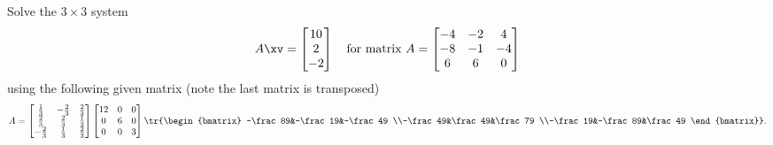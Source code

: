 \begin{example} \label{eg:3by3svd}
Solve the \(3\times3\) system
\begin{equation*}
A\xv=\begin{bmatrix} 10\\2\\-2 \end{bmatrix}
\quad\text{for matrix }A=\begin{bmatrix}-4&-2&4
\\-8&-1&-4
\\6&6&0\end{bmatrix}
\end{equation*}
using the following given matrix  (note the last matrix is transposed)
\begin{equation*}
A=\begin{bmatrix} \frac13&-\frac23&\frac23
\\\frac23&\frac23&\frac13
\\-\frac23&\frac13&\frac23 \end{bmatrix}
\begin{bmatrix} 12&0&0\\0&6&0\\0&0&3 \end{bmatrix}
\tr{\begin{bmatrix} -\frac89&-\frac19&-\frac49
\\-\frac49&\frac49&\frac79
\\-\frac19&-\frac89&\frac49 \end{bmatrix}}.
\end{equation*}


\end{example}
